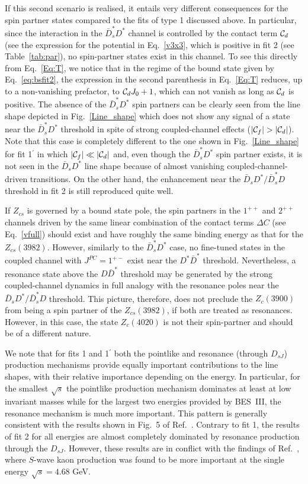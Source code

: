 \documentclass[preprint,12pt,3p]{elsarticle}
\begin{document}
If this second scenario is realised, it entails very different consequences for the spin partner states compared to the fits of type 1 discussed
above. In particular, since the interaction in the $\bar{D}_s^* D^*$ channel is controlled by the contact term ${\cal C}_d$ 
(see the expression for the potential in Eq.~\eqref{v3x3}, which is positive in fit 2 (see Table~\ref{tab:par}), no
spin-partner states exist in this channel. To see this directly from Eq.~\eqref{Eq:T}, we notice that in the regime of the bound state given by Eq.~\eqref{eq:bsfit2}, the expression in the second parenthesis in Eq.~\eqref{Eq:T} reduces, up to a non-vanishing prefactor, to ${\cal C}_d J_0+1$, which can not vanish as long as ${\cal C}_d$ is positive. The absence of the $\bar{D}_s^* D^*$ spin partners can be clearly seen from
the line shape depicted in Fig.~\ref{Line_shape} which does not show any signal of a state near the $\bar{D}_s^* D^*$ threshold in spite of
strong coupled-channel effects ($|{\cal C}_f| > |{\cal C}_d|$). Note that this case is completely different to the one shown in Fig.~\ref{Line_shape} for fit 1$^\prime$ in which $|{\cal C}_f| \ll |{\cal C}_d|$ and, even though the $\bar{D}_s^* D^*$ spin partner exists, it is not seen in the $\bar{D}_s D^*$ line shape because of almost vanishing coupled-channel-driven transitions. On the other hand, the enhancement near the $\bar{D}_s D^*/ \bar{D}_s^* D$ threshold in fit 2 is still reproduced quite well.

If $Z_{cs}$ is governed by a bound state pole, the spin partners in the $1^{++}$ and $2^{++}$ channels driven by the same linear combination of the contact terms $\Delta C$ (see Eq.~\eqref{vfull}) should exist and have roughly the same binding energy as that for the $Z_{cs}(3982)$. However, similarly to the $\bar{D}_s^* D^*$ case, no fine-tuned states in the coupled channel with $J^{PC}=1^{+-}$ exist near the $D^*\bar{D}^* $ threshold. Nevertheless, a resonance state above the $D{\bar D^*}$ threshold may be generated by the strong coupled-channel dynamics in full analogy with the resonance poles near the $\bar{D}_s D^*/ \bar{D}_s^* D$ threshold. This picture, therefore, does not preclude the $Z_c(3900)$ from being a spin partner of the $Z_{cs}(3982)$, if both are treated as resonances. However, in this case, the state $Z_c(4020)$ is not their spin-partner and should be of a different nature. 
 
We note that for fits 1 and 1$^\prime$ both the pointlike and resonance (through $D_{sJ}$) production mechanisms provide equally important contributions to the line shapes, with their relative importance depending on the energy. In particular, for the smallest $\sqrt{s}$ the pointlike production mechanism dominates at least at low invariant masses while for the largest two energies 
provided by BES~III, the resonance mechanism is much more important. This pattern is generally consistent with the results shown in Fig.~5 of Ref.~\cite{Yang:2020nrt}. 
Contrary to fit 1, the results of fit 2 for all energies are almost completely dominated by resonance production through the $D_{sJ}$. 
However, these results are in conflict with the findings of Ref.~\cite{Du:2020vwb}, where $S$-wave kaon production was found to be more important at the single energy $\sqrt{s}=4.68$ GeV. 
\end{document}
